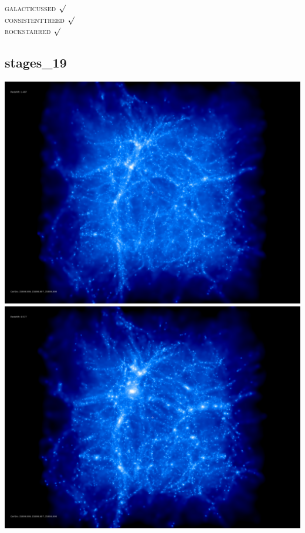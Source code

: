 \textsc{galacticussed} $\surd$ \\
\textsc{consistenttreed} $\surd$ \\ 
\textsc{rockstarred} $\surd$

% 
%
%
%
%
%
%
%

\newpage
\subsection{stages\_19}

\includegraphics[scale=0.1]{stages_19/50.jpg} 
\includegraphics[scale=0.1]{stages_19/100.jpg}  \\

